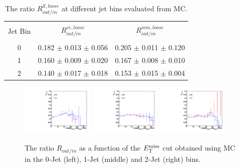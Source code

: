 \begin{table}
\begin{center}
\begin{tabular}{c c c }
\hline
\vspace{-3mm} && \\
Jet Bin & $R_{out/in}^{ee,loose}$ &  $R_{out/in}^{mm,loose}$\\
\vspace{-3mm} && \\
\hline
0 & 0.182 $\pm$ 0.013 $\pm$ 0.056 & 0.205 $\pm$ 0.011 $\pm$ 0.120 \\
1 & 0.160 $\pm$ 0.009 $\pm$ 0.020 & 0.167 $\pm$ 0.008 $\pm$ 0.010 \\
2 & 0.140 $\pm$ 0.017 $\pm$ 0.018 & 0.153 $\pm$ 0.015 $\pm$ 0.004 \\
\hline
\end{tabular}
\end{center}
\caption{The ratio $R_{out/in}^{ll,loose}$ at different jet bins evaluated from MC.  }
\label{tab:Routinmc}
\end{table}

\begin{figure}[!htbp]
\begin{center}
\includegraphics[width=0.3\textwidth]{figures/Routin_mc_0Jet.pdf}
\includegraphics[width=0.3\textwidth]{figures/Routin_mc_1Jet.pdf}
\includegraphics[width=0.3\textwidth]{figures/Routin_mc_2Jet.pdf}
\caption{ The ratio $R_{out/in}$ as a function of the $E_\mathrm{T}^{\mathrm{miss}}$ cut obtained using MC in the 
0-Jet (left), 1-Jet (middle) and 2-Jet (right) bins.} %
\label{fig:routin_met}
\end{center}
\end{figure}


